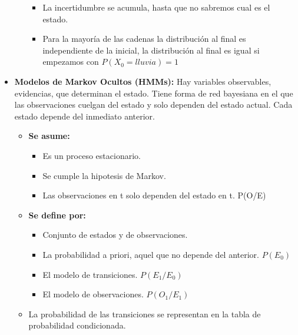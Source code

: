\documentclass[12pt, twoside, openright]{report} %
\begin{document}
\begin{itemize}
\begin{itemize}
      \begin{itemize}
      \item La incertidumbre se acumula, hasta que no sabremos cual es el
        estado.
        
      \item Para la mayoría de las cadenas la distribución al final es
        independiente de la inicial, la distribución al final es igual
        si empezamos con $P(X_0=lluvia)=1$
        
      \end{itemize}
    \end{itemize}
  \item \textbf{Modelos de Markov Ocultos (HMMs):} Hay variables
    observables, evidencias, que determinan el estado. Tiene forma de
    red bayesiana en el que las observaciones cuelgan del estado y solo
    dependen del estado actual. Cada estado depende del inmediato
    anterior.
    

    \begin{itemize}
    \item \textbf{Se asume:}
      

      \begin{itemize}
      \item Es un proceso estacionario.
        
      \item Se cumple la hipotesis de Markov.
        
      \item Las observaciones en t solo dependen del estado en t. P(O/E)
        
      \end{itemize}
    \item \textbf{Se define por:}
      

      \begin{itemize}
      \item Conjunto de estados y de observaciones.
        
      \item La probabilidad a priori, aquel que no depende del anterior.
        $P(E_0)$
        
      \item El modelo de transiciones. $P(E_1/E_0)$
        
      \item El modelo de observaciones. $P(O_1/E_1)$
        
      \end{itemize}
    \item La probabilidad de las transiciones se representan en la tabla de
      probabilidad condicionada.
      

\end{itemize}
\end{itemize}
\end{document}
